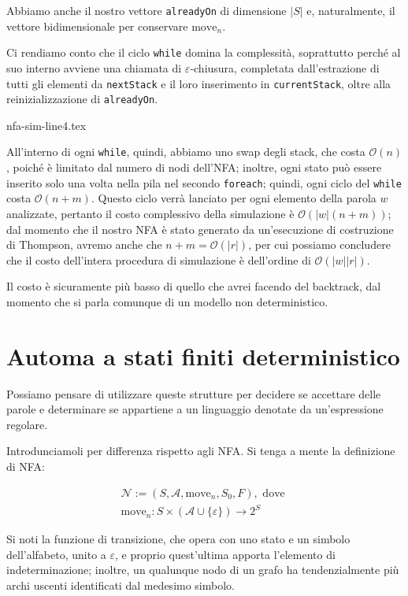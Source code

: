\documentclass[class=book, crop=false, oneside, 12pt]{standalone}
\begin{document}
\noindent Abbiamo anche il nostro vettore \texttt{alreadyOn} di dimensione \(|S|\) e, naturalmente, il vettore bidimensionale per conservare \(\textrm{move}_n\).

Ci rendiamo conto che il ciclo \texttt{while} domina la complessità, soprattutto perché al suo interno avviene una chiamata di \(\varepsilon\)-chiusura, completata dall'estrazione di tutti gli elementi da \texttt{nextStack} e il loro inserimento in \texttt{currentStack}, oltre alla reinizializzazione di \texttt{alreadyOn}.

{nfa-sim-line4.tex}

All'interno di ogni \texttt{while}, quindi, abbiamo uno swap degli stack, che costa \(\mathcal{O}(n)\), poiché è limitato dal numero di nodi dell'NFA; inoltre, ogni stato può essere inserito solo una volta nella pila nel secondo \texttt{foreach}; quindi, ogni ciclo del \texttt{while} costa \(\mathcal{O}(n + m)\). Questo ciclo verrà lanciato per ogni elemento della parola \(w\) analizzate, pertanto il costo complessivo della simulazione è \(\mathcal{O}(|w|(n + m))\); dal momento che il nostro NFA è stato generato da un'esecuzione di costruzione di Thompson, avremo anche che \(n + m = \mathcal{O}(|r|)\), per cui possiamo concludere che il costo  dell'intera procedura di simulazione è dell'ordine di \(\mathcal{O}(|w||r|)\).

Il costo è sicuramente più basso di quello che avrei facendo del backtrack, dal momento che si parla comunque di un modello non deterministico. 

\section{Automa a stati finiti deterministico}
Possiamo pensare di utilizzare queste strutture per decidere se accettare delle parole e determinare se appartiene a un linguaggio denotate da un'espressione regolare.

Introdunciamoli per differenza rispetto agli NFA. Si tenga a mente la definizione di NFA:

\begin{gather*}
    \mathcal{N} := (S, \mathcal{A}, \textrm{move}_n, S_0, F), \textrm{ dove } \\
    \textrm{move}_n : S \times (\mathcal{A} \cup \{\varepsilon\}) \to 2^S
\end{gather*}

Si noti la funzione di transizione, che opera con uno stato e un simbolo dell'alfabeto, unito a \(\varepsilon\), e proprio quest'ultima apporta l'elemento di indeterminazione; inoltre, un qualunque nodo di un grafo ha tendenzialmente più archi uscenti identificati dal medesimo simbolo.
\end{document}
